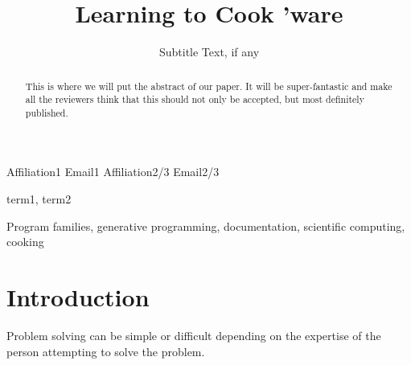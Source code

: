 \documentclass[10pt, preprint]{sigplanconf}
\begin{document}
\setlength{\pdfpageheight}{\paperheight}
\setlength{\pdfpagewidth}{\paperwidth}






\title{Learning to Cook 'ware}
\subtitle{Subtitle Text, if any} %

           {Affiliation1}
           {Email1}
           {Affiliation2/3}
           {Email2/3}

\maketitle

\begin{abstract}
This is where we will put the abstract of our paper. It will be super-fantastic and make all the reviewers think that this should not only be accepted, but most definitely published.
\end{abstract}


\terms
term1, term2

\keywords
Program families, generative programming, documentation, scientific computing, cooking %

\section{Introduction} %

Problem solving can be simple or difficult depending on the expertise of the person attempting to solve the problem.
\end{document}
